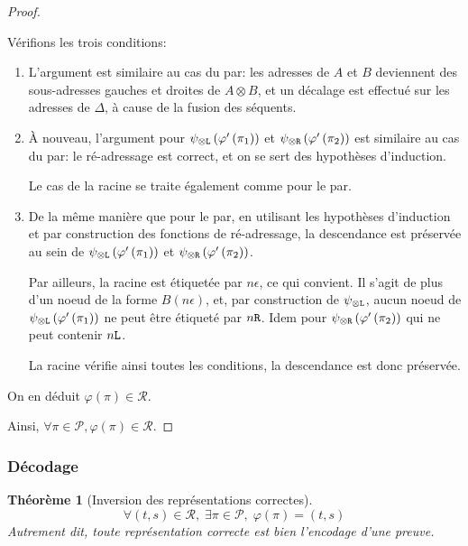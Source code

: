 \documentclass[11pt,a4paper]{article}
\theoremstyle{plain}
\newtheorem{theorem}{Théorème}
\theoremstyle{definition}
\theoremstyle{remark}
\newcommand*{\tensor}{\otimes}
\newcommand*{\someproof}{\pi}
\newcommand*{\Left}{\textnormal{\texttt{L}}}
\newcommand*{\Right}{\textnormal{\texttt{R}}}
\newcommand*{\proofs}{\ensuremath{\mathcal{P}}}
\newcommand*{\representations}{\ensuremath{\mathcal{R}}}
\newcommand*{\encode}{\ensuremath{\varphi}}
\begin{document}
\begin{proof}
\begin{description}
    Vérifions les trois conditions:
    \begin{enumerate}
        \item L'argument est similaire au cas du par: les adresses de $A$ et $B$ deviennent des sous-adresses gauches et droites de $A \tensor B$, et un décalage est effectué sur les adresses de $\Delta$, à cause de la fusion des séquents.

        \item À nouveau, l'argument pour $\psi_{\tensor\Left} \left( \encode' \left( \pi_1 \right) \right)$ et $\psi_{\tensor\Right} \left( \encode' \left( \pi_2 \right) \right)$ est similaire au cas du par: le ré-adressage est correct, et on se sert des hypothèses d'induction.
        
        Le cas de la racine se traite également comme pour le par.

        \item De la même manière que pour le par, en utilisant les hypothèses d'induction et par construction des fonctions de ré-adressage, la descendance est préservée au sein de $\psi_{\tensor\Left} \left( \encode' \left( \pi_1 \right) \right)$ et $\psi_{\tensor\Right} \left( \encode' \left( \pi_2 \right) \right)$.

        Par ailleurs, la racine est étiquetée par $n \epsilon$, ce qui convient. Il s'agit de plus d'un noeud de la forme $B(n \epsilon)$, et, par construction de $\psi_{\tensor\Left}$, aucun noeud de $\psi_{\tensor\Left} \left( \encode' \left( \pi_1 \right) \right)$ ne peut être étiqueté par $n \Right$. Idem pour $\psi_{\tensor\Right} \left( \encode' \left( \pi_2 \right) \right)$ qui ne peut contenir $n \Left$.

        La racine vérifie ainsi toutes les conditions, la descendance est donc préservée.
    \end{enumerate}

    On en déduit $\encode \left( \someproof \right) \in \representations$.
    \end{description}

    Ainsi, $\forall \someproof \in \proofs, \encode \left( \someproof \right) \in \representations$.
\end{proof}

\subsubsection{Décodage}

\begin{theorem}[Inversion des représentations correctes]
\begin{equation*}
\forall (t,s) \in \representations, \; \exists \someproof \in \proofs, \; \encode \left( \someproof \right) = (t, s)
\end{equation*}
Autrement dit, toute représentation correcte est bien l'encodage d'une preuve.
\end{theorem}
\end{document}
